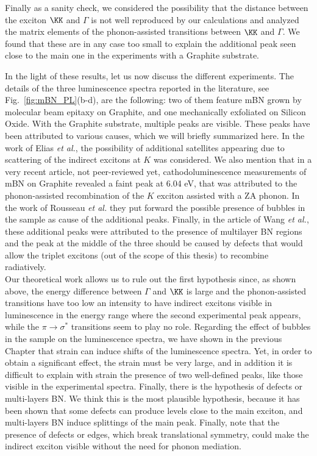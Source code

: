 Finally as a sanity check, we considered the possibility that the distance between the exciton $\KK$ and $\Gamma$ is not well reproduced by our calculations and analyzed the matrix elements of the phonon-assisted transitions between $\KK$ and $\Gamma$. We found that these are in any case too small to explain the additional peak seen close to the main one in the experiments with a Graphite substrate.

In the light of these results, let us now discuss the different experiments. The details of the three luminescence spectra reported in the literature, see Fig.~\ref{fig:mBN_PL}(b-d), are the following: two of them feature mBN grown by molecular beam epitaxy on Graphite,\cite{elias2019direct,wang2022scalable} and one mechanically exfoliated on Silicon Oxide.\cite{rousseau2021monolayer}
With the Graphite substrate, multiple peaks are visible.
These peaks have been attributed to various causes, which we will briefly summarized here. In the work of Elias \emph{et al.},\cite{elias2019direct} the possibility of additional satellites appearing due to scattering of the indirect excitons at $K$ was considered. We also mention that in a very recent article, not peer-reviewed yet,\cite{shima2023cathodoluminescence} cathodoluminescence measurements of mBN on Graphite revealed a faint peak at 6.04 eV, that was attributed to the phonon-assisted recombination of the $K$ exciton assisted with a ZA phonon.
In the work of Rousseau \emph{et al.}\cite{rousseau2021monolayer} they put forward the possible presence of bubbles in the sample as cause of the additional peaks. 
Finally, in the article of Wang \emph{et al.}\cite{wang2022scalable}, these additional peaks were attributed to the presence of multilayer BN regions and the peak at the middle of the three should be caused by defects that would allow the triplet excitons (out of the scope of this thesis) to recombine radiatively. \\


Our theoretical work allows us to rule out the first hypothesis since, as shown above, the energy difference between $\Gamma$ and $\KK$ is large and the phonon-assisted transitions have too low an intensity to have indirect excitons visible in luminescence in the energy range where the second experimental peak appears, while the $\pi\rightarrow\sigma^*$ transitions seem to play no role. Regarding the effect of bubbles in the sample on the luminescence spectra, we have shown in the previous Chapter that strain can induce shifts of the luminescence spectra.\cite{lechifflart2022excitons}
Yet, in order to obtain a significant effect, the strain must be very large, and in addition it is difficult to explain with strain the presence of two well-defined peaks, like those visible in the experimental spectra. 
Finally, there is the hypothesis of defects or multi-layers BN. We think this is the most plausible hypothesis, because it has been shown that some defects can produce levels close to the main exciton,\cite{attaccalite2011coupling} and multi-layers BN induce splittings of the main peak.\cite{paleari2018excitons} 
Finally, note that the presence of defects or edges, which break translational symmetry, could make the indirect exciton visible without the need for phonon mediation.\cite{feierabend2017proposal}


